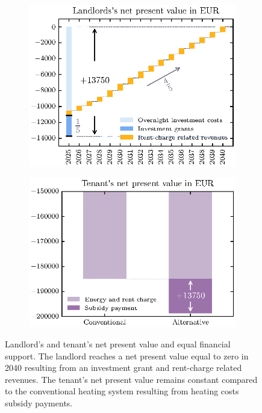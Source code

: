 \begin{figure}[h]
	\begin{subfigure}[c]{0.5\textwidth}
		\centering
		\includegraphics[width=1\linewidth]{figures/3_Methodology/Validate-Landlord.eps}
		\label{fig:landlord}
	\end{subfigure}
	\begin{subfigure}[c]{0.5\textwidth}
		\centering
		\includegraphics[width=1\linewidth]{figures/3_Methodology/Validate-Tenant.eps}
		\label{fig:tenant}
	\end{subfigure}
	\caption{Landlord's and tenant's net present value and equal financial support. The landlord reaches a net present value equal to zero in 2040 resulting from an investment grant and rent-charge related revenues. The tenant's net present value remains constant compared to the conventional heating system resulting from heating costs subsidy payments.}
	\label{val:npv}
\end{figure}

